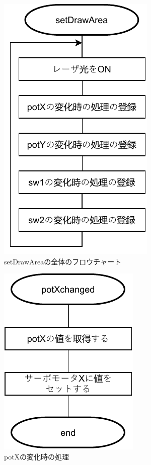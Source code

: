 \documentclass{jarticle}
\begin{document}
\begin{figure}[H]
    \centering
    \includegraphics{kadai5setDrawArea-Page-1.pdf}
    \caption{setDrawAreaの全体のフロウチャート}
    \label{fig:my_label}
\end{figure}

\begin{figure}[H]
    \centering
    \includegraphics{kadai5setDrawArea-potXchanged.pdf}
    \caption{potXの変化時の処理}
    \label{fig:my_label}
\end{figure}
\end{document}
